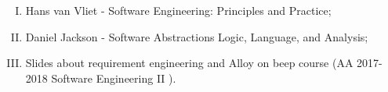 \begin{enumerate}[(I)]
  \item Hans van Vliet - Software Engineering: Principles and Practice;
  \item Daniel Jackson - Software Abstractions Logic, Language, and Analysis;
  \item Slides about requirement engineering and Alloy on beep course (AA 2017-2018 Software Engineering II ).
\end{enumerate}
